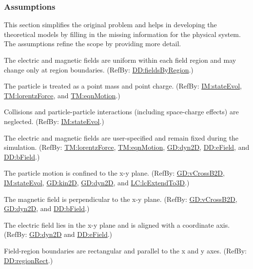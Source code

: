 \documentclass[12pt]{article}
\begin{document}
\subsubsection{Assumptions}
\label{Sec:Assumps}
This section simplifies the original problem and helps in developing the theoretical models by filling in the missing information for the physical system. The assumptions refine the scope by providing more detail.

\begin{description}[font=\normalfont]
\item[piecewiseUniform:\phantomsection\label{piecewiseUniform}]{The electric and magnetic fields are uniform within each field region and may change only at region boundaries. (RefBy: \hyperref[DD:fieldsByRegion]{DD:fieldsByRegion}.)}
\item[singleParticle:\phantomsection\label{singleParticle}]{The particle is treated as a point mass and point charge. (RefBy: \hyperref[IM:stateEvol]{IM:stateEvol}, \hyperref[TM:lorentzForce]{TM:lorentzForce}, and \hyperref[TM:eqnMotion]{TM:eqnMotion}.)}
\item[noInteractions:\phantomsection\label{noInteractions}]{Collisions and particle-particle interactions (including space-charge effects) are neglected. (RefBy: \hyperref[IM:stateEvol]{IM:stateEvol}.)}
\item[prescribedFields:\phantomsection\label{prescribedFields}]{The electric and magnetic fields are user-specified and remain fixed during the simulation. (RefBy: \hyperref[TM:lorentzForce]{TM:lorentzForce}, \hyperref[TM:eqnMotion]{TM:eqnMotion}, \hyperref[GD:dyn2D]{GD:dyn2D}, \hyperref[DD:eField]{DD:eField}, and \hyperref[DD:bField]{DD:bField}.)}
\item[twoDMotion:\phantomsection\label{twoDMotion}]{The particle motion is confined to the x-y plane. (RefBy: \hyperref[GD:vCrossB2D]{GD:vCrossB2D}, \hyperref[IM:stateEvol]{IM:stateEvol}, \hyperref[GD:kin2D]{GD:kin2D}, \hyperref[GD:dyn2D]{GD:dyn2D}, and \hyperref[lcExtendTo3D]{LC:lcExtendTo3D}.)}
\item[bPerpPlane:\phantomsection\label{bPerpPlane}]{The magnetic field is perpendicular to the x-y plane. (RefBy: \hyperref[GD:vCrossB2D]{GD:vCrossB2D}, \hyperref[GD:dyn2D]{GD:dyn2D}, and \hyperref[DD:bField]{DD:bField}.)}
\item[eAxisAligned:\phantomsection\label{eAxisAligned}]{The electric field lies in the x-y plane and is aligned with a coordinate axis. (RefBy: \hyperref[GD:dyn2D]{GD:dyn2D} and \hyperref[DD:eField]{DD:eField}.)}
\item[rectRegions:\phantomsection\label{rectRegions}]{Field-region boundaries are rectangular and parallel to the x and y axes. (RefBy: \hyperref[DD:regionRect]{DD:regionRect}.)}

\end{description}
\end{document}
